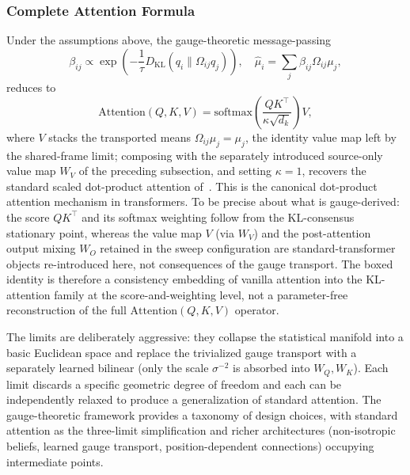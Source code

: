 \documentclass[11pt]{article}
\begin{document}
\subsubsection{Complete Attention Formula}

Under the assumptions above, the gauge-theoretic message-passing
\begin{equation}
\beta_{ij} \propto \exp\left(-\frac{1}{\tau}D_{\mathrm{KL}}(q_i \| \Omega_{ij} q_j)\right), \quad \hat\mu_i = \sum_j \beta_{ij} \Omega_{ij}\mu_j,
\end{equation}
reduces to
\begin{equation}
\boxed{\mathrm{Attention}(Q,K,V) = \mathrm{softmax}\left(\frac{QK^\top}{\kappa\sqrt{d_k}}\right)V},
\end{equation}
where $V$ stacks the transported means $\Omega_{ij}\mu_j = \mu_j$, the identity value map left by the shared-frame limit; composing with the separately introduced source-only value map $W_V$ of the preceding subsection, and setting $\kappa = 1$, recovers the standard scaled dot-product attention of~\cite{vaswani2017attention}. This is the canonical dot-product attention mechanism in transformers. To be precise about what is gauge-derived: the score $QK^\top$ and its softmax weighting follow from the KL-consensus stationary point, whereas the value map $V$ (via $W_V$) and the post-attention output mixing $W_O$ retained in the sweep configuration are standard-transformer objects re-introduced here, not consequences of the gauge transport. The boxed identity is therefore a consistency embedding of vanilla attention into the KL-attention family at the score-and-weighting level, not a parameter-free reconstruction of the full $\mathrm{Attention}(Q,K,V)$ operator.

The limits are deliberately aggressive: they collapse the statistical manifold into a basic Euclidean space and replace the trivialized gauge transport with a separately learned bilinear (only the scale $\sigma^{-2}$ is absorbed into $W_Q, W_K$). Each limit discards a specific geometric degree of freedom and each can be independently relaxed to produce a generalization of standard attention. The gauge-theoretic framework provides a taxonomy of design choices, with standard attention as the three-limit simplification and richer architectures (non-isotropic beliefs, learned gauge transport, position-dependent connections) occupying intermediate points.
\end{document}
